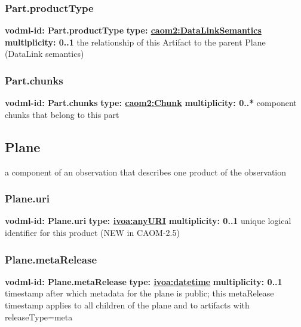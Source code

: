     \subsubsection{Part.productType}
      \textbf{vodml-id: Part.productType} \newline
      \textbf{type: \hyperref[sect:DataLinkSemantics]{caom2:DataLinkSemantics}} \newline
      \textbf{multiplicity: 0..1} \newline
      the relationship of this Artifact to the parent Plane (DataLink semantics)

    \subsubsection{Part.chunks}
      \textbf{vodml-id: Part.chunks} \newline
      \textbf{type: \hyperref[sect:Chunk]{caom2:Chunk}} \newline
      \textbf{multiplicity: 0..*} \newline
      component chunks that belong to this part

  \subsection{Plane}
  \label{sect:Plane}
    a component of an observation that describes one product of the observation

    \subsubsection{Plane.uri}
      \textbf{vodml-id: Plane.uri} \newline
      \textbf{type: \hyperref[sect:ivoa]{ivoa:anyURI}} \newline
      \textbf{multiplicity: 0..1} \newline
      unique logical identifier for this product (NEW in CAOM-2.5)

    \subsubsection{Plane.metaRelease}
      \textbf{vodml-id: Plane.metaRelease} \newline
      \textbf{type: \hyperref[sect:ivoa]{ivoa:datetime}} \newline
      \textbf{multiplicity: 0..1} \newline
      timestamp after which metadata for the plane is public; this metaRelease timestamp applies to all children of the plane and to artifacts with releaseType=meta

